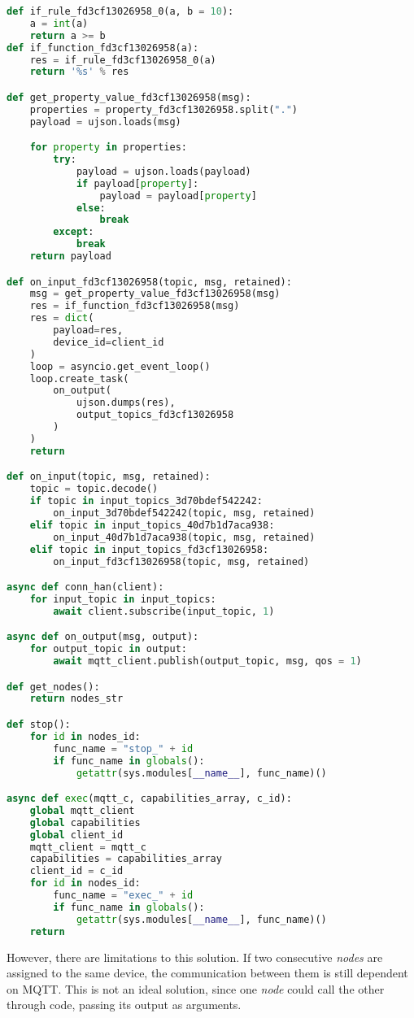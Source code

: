 \begin{lstlisting}[language=Python, caption={Code generated from the flow presented in Figure \ref{fig:code_generation_flow}.}, captionpos=b, label={lst:code_generation}]
def if_rule_fd3cf13026958_0(a, b = 10):
    a = int(a)
    return a >= b
def if_function_fd3cf13026958(a):
    res = if_rule_fd3cf13026958_0(a)
    return '%s' % res

def get_property_value_fd3cf13026958(msg):
    properties = property_fd3cf13026958.split(".")
    payload = ujson.loads(msg)

    for property in properties:
        try:
            payload = ujson.loads(payload)
            if payload[property]:
                payload = payload[property]
            else:
                break
        except:
            break
    return payload

def on_input_fd3cf13026958(topic, msg, retained):
    msg = get_property_value_fd3cf13026958(msg)
    res = if_function_fd3cf13026958(msg)
    res = dict(
        payload=res,
        device_id=client_id
    )
    loop = asyncio.get_event_loop()
    loop.create_task(
        on_output(
            ujson.dumps(res),
            output_topics_fd3cf13026958
        )
    )
    return

def on_input(topic, msg, retained):
    topic = topic.decode()
    if topic in input_topics_3d70bdef542242:
        on_input_3d70bdef542242(topic, msg, retained)
    elif topic in input_topics_40d7b1d7aca938:
        on_input_40d7b1d7aca938(topic, msg, retained)
    elif topic in input_topics_fd3cf13026958:
        on_input_fd3cf13026958(topic, msg, retained)

async def conn_han(client):
    for input_topic in input_topics:
        await client.subscribe(input_topic, 1)

async def on_output(msg, output):
    for output_topic in output:
        await mqtt_client.publish(output_topic, msg, qos = 1)

def get_nodes():
    return nodes_str

def stop():
    for id in nodes_id:
        func_name = "stop_" + id
        if func_name in globals():
            getattr(sys.modules[__name__], func_name)()

async def exec(mqtt_c, capabilities_array, c_id):
    global mqtt_client
    global capabilities
    global client_id
    mqtt_client = mqtt_c
    capabilities = capabilities_array
    client_id = c_id
    for id in nodes_id:
        func_name = "exec_" + id
        if func_name in globals():
            getattr(sys.modules[__name__], func_name)()
    return
\end{lstlisting}

However, there are limitations to this solution. If two consecutive \textit{nodes} are assigned to the same device, the communication between them is still dependent on MQTT. This is not an ideal solution, since one \textit{node} could call the other through code, passing its output as arguments.


